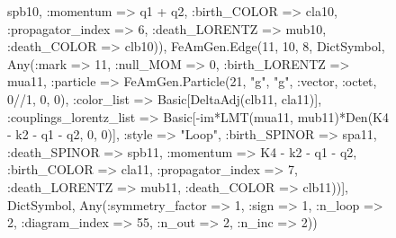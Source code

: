 \documentclass{revtex4}
\begin{document}
\begin{figure}[!htb]
\begin{center}
{spb10, :momentum => q1 + q2, :birth_COLOR => cla10, :propagator_index => 6, :death_LORENTZ => mub10, :death_COLOR => clb10)), FeAmGen.Edge(11, 10, 8, Dict{Symbol, Any}(:mark => 11, :null_MOM => 0, :birth_LORENTZ => mua11, :particle => FeAmGen.Particle(21, "g", "g", :vector, :octet, 0//1, 0, 0), :color_list => Basic[DeltaAdj(clb11, cla11)], :couplings_lorentz_list => Basic[-im*LMT(mua11, mub11)*Den(K4 - k2 - q1 - q2, 0, 0)], :style => "Loop", :birth_SPINOR => spa11, :death_SPINOR => spb11, :momentum => K4 - k2 - q1 - q2, :birth_COLOR => cla11, :propagator_index => 7, :death_LORENTZ => mub11, :death_COLOR => clb11))], Dict{Symbol, Any}(:symmetry_factor => 1, :sign => 1, :n_loop => 2, :diagram_index => 55, :n_out => 2, :n_inc => 2)) 
}
\end{center}
\end{figure}
\end{document}

